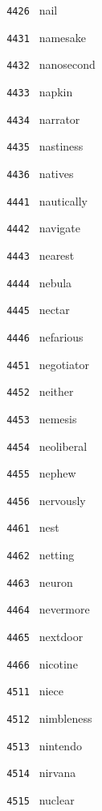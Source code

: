 \documentclass[11pt]{article}
\begin{document}
\begin{multicols}{6}
\noindent \texttt{ 4426 } nail  \par
\vspace{3mm}
\noindent \texttt{ 4431 } namesake  \par
\noindent \texttt{ 4432 } nanosecond  \par
\noindent \texttt{ 4433 } napkin  \par
\noindent \texttt{ 4434 } narrator  \par
\noindent \texttt{ 4435 } nastiness  \par
\noindent \texttt{ 4436 } natives  \par
\vspace{3mm}
\noindent \texttt{ 4441 } nautically  \par
\noindent \texttt{ 4442 } navigate  \par
\noindent \texttt{ 4443 } nearest  \par
\noindent \texttt{ 4444 } nebula  \par
\noindent \texttt{ 4445 } nectar  \par
\noindent \texttt{ 4446 } nefarious  \par
\vspace{3mm}
\noindent \texttt{ 4451 } negotiator  \par
\noindent \texttt{ 4452 } neither  \par
\noindent \texttt{ 4453 } nemesis  \par
\noindent \texttt{ 4454 } neoliberal  \par
\noindent \texttt{ 4455 } nephew  \par
\noindent \texttt{ 4456 } nervously  \par
\vspace{3mm}
\noindent \texttt{ 4461 } nest  \par
\noindent \texttt{ 4462 } netting  \par
\noindent \texttt{ 4463 } neuron  \par
\noindent \texttt{ 4464 } nevermore  \par
\noindent \texttt{ 4465 } nextdoor  \par
\noindent \texttt{ 4466 } nicotine  \par
\noindent \texttt{ 4511 } niece  \par
\noindent \texttt{ 4512 } nimbleness  \par
\noindent \texttt{ 4513 } nintendo  \par
\noindent \texttt{ 4514 } nirvana  \par
\noindent \texttt{ 4515 } nuclear  \par

\end{multicols}
\end{document}
